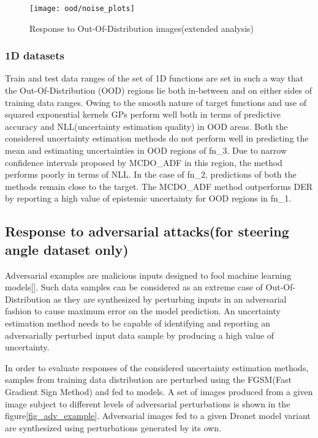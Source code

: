 \begin{figure}[H]
	\centering
	\texttt{[image: ood/noise\_plots]}
	\caption{Response to Out-Of-Distribution images(extended analysis) }
	\label{fig_ood_extended}
	\hfill
\end{figure}
\subsubsection{1D datasets}
Train and test data ranges of the set of 1D functions are set in such a way that the Out-Of-Distribution (OOD) regions lie both in-between and on either sides of training data ranges. Owing to the smooth nature of target functions and use of squared exponential kernels GPs perform well both in terms of predictive accuracy and NLL(uncertainty estimation quality) in OOD areas. Both the considered uncertainty estimation methods do not perform well in predicting the mean and estimating uncertainties in OOD regions of fn\_3. Due to narrow confidence intervals proposed by MCDO\_ADF in this region, the method performs poorly in terms of NLL. In the case of fn\_2, predictions of both the methods remain close to the target. The MCDO\_ADF method outperforms DER by reporting a high value of epistemic uncertainty for OOD regions in fn\_1. 
\subsection{Response to adversarial attacks(for steering angle dataset only)}\label{subsec_adv}
Adversarial examples are malicious inputs designed to fool machine learning models[\cite{kurakin2016adversarial}]. Such data samples can be considered as an extreme case of Out-Of-Distribution as they are synthesized by perturbing inputs in an adversarial fashion to cause maximum error on the model prediction. An uncertainty estimation method needs to be capable of identifying and reporting an adversarially perturbed input data sample by producing a high value of uncertainty. 

In order to evaluate responses of the considered uncertainty estimation methods, samples from training data distribution are perturbed using the FGSM(Fast Gradient Sign Method)\cite{goodfellow2015explaining} and fed to models. A set of images produced from a given image subject to different levels of adversarial perturbations is shown in the figure\ref{fig_adv_example}. Adversarial images fed to a given Dronet model variant are synthesized using perturbations generated by its own.  

